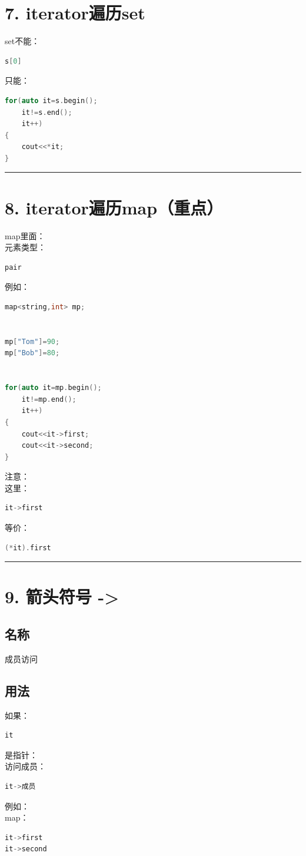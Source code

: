 \documentclass[9pt,twocolumn]{extarticle}
\begin{document}
\section{7. iterator遍历set}

set不能：
\begin{lstlisting}[language=C++]
s[0]
\end{lstlisting}
只能：
\begin{lstlisting}[language=C++]
for(auto it=s.begin();
    it!=s.end();
    it++)
{
    cout<<*it;
}
\end{lstlisting}

\noindent\rule{\linewidth}{0.4pt}

\section{8. iterator遍历map（重点）}

map里面：\\
元素类型：
\begin{lstlisting}[language=C++]
pair
\end{lstlisting}
例如：
\begin{lstlisting}[language=C++]
map<string,int> mp;


mp["Tom"]=90;
mp["Bob"]=80;


for(auto it=mp.begin();
    it!=mp.end();
    it++)
{
    cout<<it->first;
    cout<<it->second;
}
\end{lstlisting}
注意：\\
这里：
\begin{lstlisting}[language=C++]
it->first
\end{lstlisting}
等价：
\begin{lstlisting}[language=C++]
(*it).first
\end{lstlisting}

\noindent\rule{\linewidth}{0.4pt}

\section{9. 箭头符号 ->}

\subsection{名称}
成员访问

\subsection{用法}
如果：
\begin{lstlisting}[language=C++]
it
\end{lstlisting}
是指针：\\
访问成员：
\begin{lstlisting}[language=C++]
it->成员
\end{lstlisting}
例如：\\
map：
\begin{lstlisting}[language=C++]
it->first
it->second
\end{lstlisting}
\end{document}
